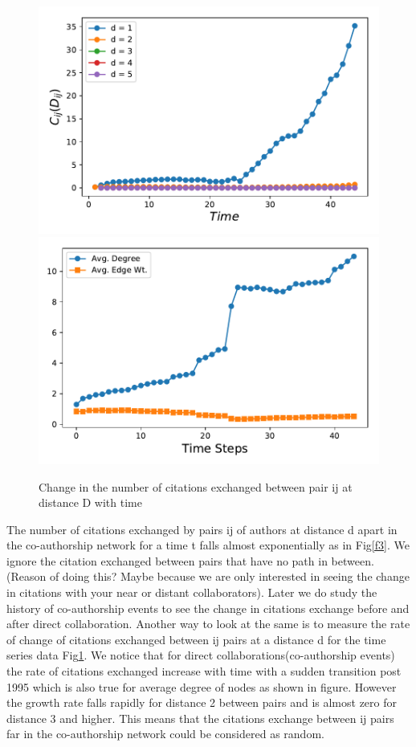 \documentclass[aps, pre, twocolumn, nofootinbib]{revtex4-1}
\begin{document}
\begin{figure}
	\centering

	\includegraphics[scale = 0.49]{plots/fig2}
	\includegraphics[scale = 0.49]{plots/fig3}
	\captionsetup{singlelinecheck=false, justification=raggedright,  labelsep=space}
	
	\caption{Change in the number of citations exchanged between pair ij at distance D with time}
	\label{f3a}
\end{figure}

The number of citations exchanged by pairs ij of authors at distance d apart in the co-authorship network for a time t falls almost exponentially as in Fig\ref{f3}. We ignore the citation exchanged between pairs that have no path in between.(Reason of doing this? Maybe because we are only interested in seeing the change in citations with your near or distant collaborators). Later we do study the history of co-authorship events to see the change in citations exchange before and after direct collaboration. 
Another way to look at the same is to measure the rate of change of citations exchanged between ij pairs at a distance d for the time series data Fig\ref{f3a}. We notice that for direct collaborations(co-authorship events) the rate of citations exchanged increase with time with a sudden transition post 1995 which is also true for average degree of nodes as shown in figure. However the growth rate falls rapidly for distance 2 between pairs and is almost zero for distance 3 and higher. {\color{blue}This means that the citations exchange between ij pairs far in the co-authorship network could be considered as random.}
\end{document}
